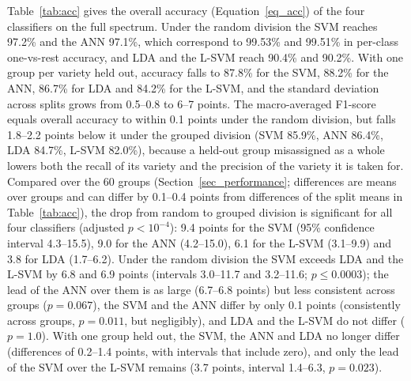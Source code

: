 \documentclass[final,5p,times,twocolumn]{elsarticle}
\newcommand{\added}[1]{#1}
\begin{document}
\added{Table~\ref{tab:acc} gives the overall accuracy (Equation~\ref{eq_acc}) of the four classifiers on the full spectrum. Under the random division the SVM reaches 97.2\% and the ANN 97.1\%, which correspond to 99.53\% and 99.51\% in per-class one-vs-rest accuracy, and LDA and the L-SVM reach 90.4\% and 90.2\%. With one group per variety held out, accuracy falls to 87.8\% for the SVM, 88.2\% for the ANN, 86.7\% for LDA and 84.2\% for the L-SVM, and the standard deviation across splits grows from 0.5--0.8 to 6--7 points. The macro-averaged F1-score equals overall accuracy to within 0.1 points under the random division, but falls 1.8--2.2 points below it under the grouped division (SVM 85.9\%, ANN 86.4\%, LDA 84.7\%, L-SVM 82.0\%), because a held-out group misassigned as a whole lowers both the recall of its variety and the precision of the variety it is taken for. Compared over the 60 groups (Section~\ref{sec_performance}; differences are means over groups and can differ by 0.1--0.4 points from differences of the split means in Table~\ref{tab:acc}), the drop from random to grouped division is significant for all four classifiers (adjusted $p<10^{-4}$): 9.4 points for the SVM (95\% confidence interval 4.3--15.5), 9.0 for the ANN (4.2--15.0), 6.1 for the L-SVM (3.1--9.9) and 3.8 for LDA (1.7--6.2). Under the random division the SVM exceeds LDA and the L-SVM by 6.8 and 6.9 points (intervals 3.0--11.7 and 3.2--11.6; $p\le0.0003$); the lead of the ANN over them is as large (6.7--6.8 points) but less consistent across groups ($p=0.067$), the SVM and the ANN differ by only 0.1 points (consistently across groups, $p=0.011$, but negligibly), and LDA and the L-SVM do not differ ($p=1.0$). With one group held out, the SVM, the ANN and LDA no longer differ (differences of 0.2--1.4 points, with intervals that include zero), and only the lead of the SVM over the L-SVM remains (3.7 points, interval 1.4--6.3, $p=0.023$).}
\end{document}

